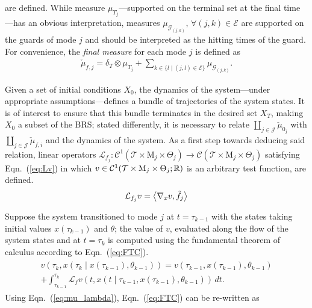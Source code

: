 are defined. While measure $\mu_{T_j}$---supported on the terminal set at the final time---has an obvious interpretation, measures $\mu_{\mathcal G_{(j,k)}},\,\forall (j,k)\in \mathcal E$ are supported on the guards of mode $j$ and should be interpreted as the hitting times of the guard.
For convenience, the {\em final measure} for each mode $j$ is defined as
\begin{align}
  \check\mu_{f,j}=\delta_T\otimes \mu_{T_j}+\sum_{k\in\{l\mid (j,l)\in \mathcal E\}}\mu_{\mathcal G_{(j,k)}}.
\label{eq:mu_T}
\end{align}
\normalsize
\par
Given a set of initial conditions $X_{0}$, the dynamics of the system---under appropriate assumptions---defines a bundle of trajectories of the system states. It is of interest to ensure that this bundle terminates in the desired set $X_T$, making $X_0$ a subset of the BRS; stated differently, it is necessary to relate $\coprod_{j\in \mathcal J}\check\mu_{0_j}$ with $\coprod_{j\in \mathcal J}\check\mu_{f,i}$ and the dynamics of the system. As a first step towards deducing said relation, linear operators {$\mathcal L_{ f_j}\colon \mathcal C^1(\mathcal T\times \mathrm M_j\times \Theta_j)\rightarrow \mathcal C(\mathcal T\times \mathrm M_j\times \Theta_j)$} satisfying Eqn.~(\ref{eq:Lv}) in which $v\in \mathcal C^1(\mathcal T\times \mathrm M_j\times \Theta_j;\mathbb{R})$ is an arbitrary test function, are defined.
\begin{align}
      \mathcal L_{f_j}v=\left\langle \nabla_x v,\tilde f_j\right\rangle
    \label{eq:Lv}
\end{align}
\par
Suppose the system transitioned to mode $j$ at \mbox{$t=\tau_{k-1}$} with the states taking initial values $x(\tau_{k-1})$ and $\theta$; the value of $v$, evaluated along the flow of the system states and at $t=\tau_{k}$ is computed using the fundamental theorem of calculus according to Eqn.~(\ref{eq:FTC}).
\begin{align}
\begin{split}
    v\left(\tau_k,x\left(\tau_{k}\mid x(\tau_{k-1}),\theta_{k-1}\right)\right)=v(\tau_{k-1},x(\tau_{k-1}),\theta_{k-1})\\
    +\int_{\tau_{k-1}}^{\tau_{k}}\mathcal L_{f}v(t,x(t\mid \tau_{k-1},x(\tau_{k-1}),\theta_{k-1}))\,dt.
\end{split}
\label{eq:FTC}
\end{align}
Using Eqn.~(\ref{eq:mu_lambda}), Eqn.~(\ref{eq:FTC}) can be re-written as

